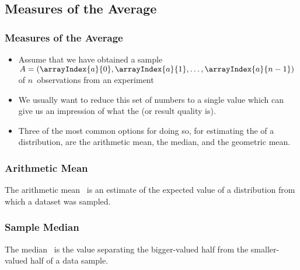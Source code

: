 \documentclass[aspectratio=169,mathserif,notheorems]{beamer}%
\begin{document}
\subsection{Measures of the Average}%
%
\begin{frame}%
\frametitle{Measures of the Average}%
\begin{itemize}%
\item Assume that we have obtained a sample~$A=(\arrayIndex{a}{0}, \arrayIndex{a}{1}, \dots, \arrayIndex{a}{n-1})$ of $n$~observations from an experiment%
\item<3-> We usually want to reduce this set of numbers to a single value which can give us an impression of what the  (or result quality is).%
\item<4-> Three of the most common options for doing so, for estimating the  of a distribution, are the \alert{arithmetic mean}, the \alert{median}, and the \alert{geometric mean}.%
\end{itemize}%
\end{frame}%
%
\begin{frame}%
\frametitle{Arithmetic Mean}%
%
\begin{definition*}%
The arithmetic mean~ is an \alert{estimate} of the expected value of a distribution from which a dataset was sampled.%
%
\end{definition*}%
\end{frame}%
%
\begin{frame}%
\frametitle{Sample Median}%
\begin{definition*}[Median]%
The median~ is the value separating the bigger-valued half from the smaller-valued half of a data sample.%
%
\end{definition*}%
%
\end{frame}%
\end{document}
